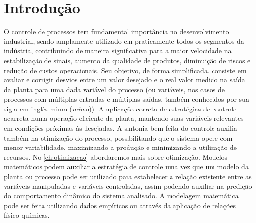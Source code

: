 
\chapter{Introdução}
\label{ch:introducao}

O controle de processos tem fundamental importância no desenvolvimento industrial,
sendo amplamente utilizado em praticamente todos os segmentos da indústria,
contribuindo de maneira significativa para a maior velocidade na estabilização de sinais,
aumento da qualidade de produtos, diminuição de riscos e redução de custos operacionais.
Seu objetivo, de forma simplificada, consiste em avaliar e corrigir desvios entre um
valor desejado e o real valor medido na saída da planta para uma dada variável do
processo (ou variáveis, nos casos de processos com múltiplas entradas e múltiplas
saídas, também conhecidos por sua sigla em inglês \acrshort{mimo} (\textit{\acrlong{mimo}})).
A aplicação correta de estratégias de controle acarreta numa operação eficiente da
planta, mantendo suas variáveis relevantes em condições próximas às desejadas.
A sintonia bem-feita do controle auxilia também na otimização do processo,
possibilitando que o sistema opere com menor variabilidade, maximizando a produção
e minimizando a utilização de recursos. No \cref{ch:otimizacao} abordaremos mais
sobre otimização.
Modelos matemáticos podem auxiliar a estratégia de controle uma vez que um modelo da
planta ou processo pode ser utilizado para estabelecer a relação existente entre as
variáveis manipuladas e variáveis controladas, assim podendo auxiliar na predição do
comportamento dinâmico do sistema analisado. A modelagem matemática pode ser feita
utilizando dados empíricos ou através da aplicação de relações físico-químicas.


